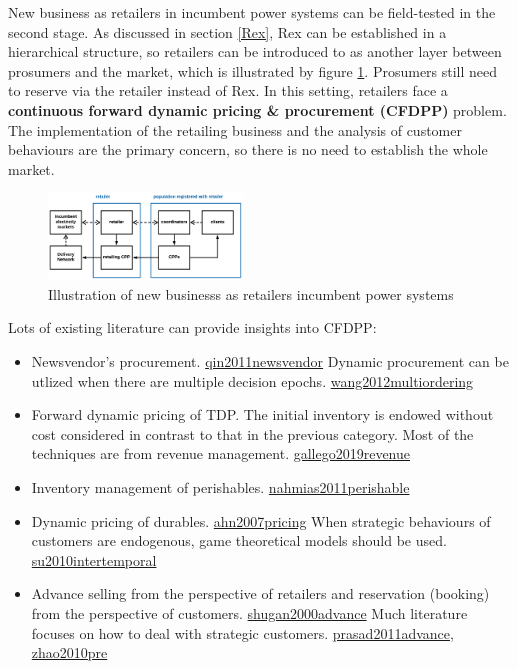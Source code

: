 \documentclass[letterpaper,8pt,twocolumn,twoside,]{pinp}
\providecommand{\tightlist}{%
  \setlength{\itemsep}{0pt}\setlength{\parskip}{0pt}}
\begin{document}
\label{EXP}

New business as retailers in incumbent power systems can be field-tested
in the second stage. As discussed in section \ref{Rex}, Rex can be
established in a hierarchical structure, so retailers can be introduced
to as another layer between prosumers and the market, which is
illustrated by figure \ref{3}. Prosumers still need to reserve via the
retailer instead of Rex. In this setting, retailers face a
\textbf{continuous forward dynamic pricing \& procurement (CFDPP)}
problem. The implementation of the retailing business and the analysis
of customer behaviours are the primary concern, so there is no need to
establish the whole market.

\begin{figure}
  \begin{center}
    \includegraphics[width=0.46\textwidth]{../../../images/4-11.png}
  \end{center}
  \caption{Illustration of new businesss as retailers incumbent power systems}
  \label{3}
\end{figure}

Lots of existing literature can provide insights into CFDPP:

\begin{itemize}
\tightlist
\item
  Newsvendor's procurement.
  \protect\hyperlink{reference}{qin2011newsvendor} Dynamic procurement
  can be utlized when there are multiple decision epochs.
  \protect\hyperlink{reference}{wang2012multiordering}
\item
  Forward dynamic pricing of TDP. The initial inventory is endowed
  without cost considered in contrast to that in the previous category.
  Most of the techniques are from revenue management.
  \protect\hyperlink{reference}{gallego2019revenue}
\item
  Inventory management of perishables.
  \protect\hyperlink{reference}{nahmias2011perishable}
\item
  Dynamic pricing of durables.
  \protect\hyperlink{reference}{ahn2007pricing} When strategic
  behaviours of customers are endogenous, game theoretical models should
  be used. \protect\hyperlink{reference}{su2010intertemporal}
\item
  Advance selling from the perspective of retailers and reservation
  (booking) from the perspective of customers.
  \protect\hyperlink{reference}{shugan2000advance} Much literature
  focuses on how to deal with strategic customers.
  \protect\hyperlink{reference}{prasad2011advance},
  \protect\hyperlink{reference}{zhao2010pre}
\end{itemize}
\end{document}
